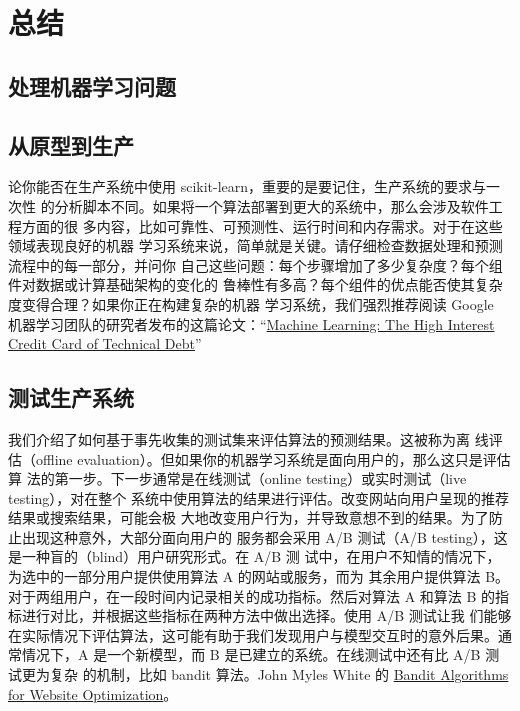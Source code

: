 \chapter{总结}
\section{处理机器学习问题}
\section{从原型到生产}
论你能否在生产系统中使用 scikit-learn，重要的是要记住，生产系统的要求与一次性
的分析脚本不同。如果将一个算法部署到更大的系统中，那么会涉及软件工程方面的很
多内容，比如可靠性、可预测性、运行时间和内存需求。对于在这些领域表现良好的机器
学习系统来说，简单就是关键。请仔细检查数据处理和预测流程中的每一部分，并问你
自己这些问题：每个步骤增加了多少复杂度？每个组件对数据或计算基础架构的变化的
鲁棒性有多高？每个组件的优点能否使其复杂度变得合理？如果你正在构建复杂的机器
学习系统，我们强烈推荐阅读 Google 机器学习团队的研究者发布的这篇论文：“\href{http://research.google.com/pubs/pub43146.html}{Machine Learning: The High Interest Credit Card of Technical Debt}”
\section{测试生产系统}
我们介绍了如何基于事先收集的测试集来评估算法的预测结果。这被称为离
线评估（offline evaluation）。但如果你的机器学习系统是面向用户的，那么这只是评估算
法的第一步。下一步通常是在线测试（online testing）或实时测试（live testing），对在整个
系统中使用算法的结果进行评估。改变网站向用户呈现的推荐结果或搜索结果，可能会极
大地改变用户行为，并导致意想不到的结果。为了防止出现这种意外，大部分面向用户的
服务都会采用 A/B 测试（A/B testing），这是一种盲的（blind）用户研究形式。在 A/B 测
试中，在用户不知情的情况下，为选中的一部分用户提供使用算法 A 的网站或服务，而为
其余用户提供算法 B。对于两组用户，在一段时间内记录相关的成功指标。然后对算法 A
和算法 B 的指标进行对比，并根据这些指标在两种方法中做出选择。使用 A/B 测试让我
们能够在实际情况下评估算法，这可能有助于我们发现用户与模型交互时的意外后果。通
常情况下，A 是一个新模型，而 B 是已建立的系统。在线测试中还有比 A/B 测试更为复杂
的机制，比如 bandit 算法。John Myles White 的 \href{http://shop.oreilly.com/product/0636920027393.do}{Bandit Algorithms for Website Optimization}。

